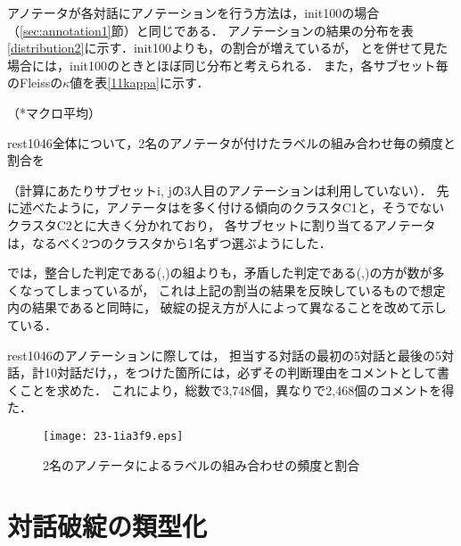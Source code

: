 \documentclass[japanese]{jnlp_1.4}
\newcommand{\maru}{}
\newcommand{\batsu}{}
\newcommand{\sankaku}{}
\renewcommand{\mod}[1]{}
\begin{document}
アノテータが各対話にアノテーションを行う方法は，init100の場合（\ref{sec:annotation1}節）と同じである．
アノテーションの結果の分布を表\ref{distribution2}に示す．init100よりも，\sankaku の割合が増えているが，
\sankaku と\batsu を併せて見た場合には，init100のときとほぼ同じ分布と考えられる．
また，各サブセット毎のFleissの$\kappa$値を表\ref{11kappa}に示す．
\mod{2名のアノテータが同じ判断傾向を持つかどうかによって，サブセット間で$\kappa$値にばらつきが生じているが，全体平均としてはinit100とほぼ同じ値になっている．}

\begin{table}[b]
\caption{rest1046中の\maru \sankaku \batsu  の発生割合（発生数）}
\label{distribution2}

\end{table}
\begin{table}[b]
\caption{サブセットa--k毎のFleissの$\kappa$値（i, jのみ3名でのアノテーション，その他は2名ずつ）}
\label{11kappa}

\vspace{4pt}\small
\hfill   （*マクロ平均）
\end{table}

rest1046全体について，2名のアノテータが付けたラベルの組み合わせ毎の頻度と割合を
\mod{図\ref{confusion}に示す}
（計算にあたりサブセットi, jの3人目のアノテーションは利用していない）．
先に述べたように，アノテータは\maru を多く付ける傾向のクラスタC1と，そうでないクラスタC2とに大きく分かれており，
各サブセットに割り当てるアノテータは，なるべく2つのクラスタから1名ずつ選ぶようにした．
\mod{図\ref{confusion}}
では，整合した判定である(\batsu,\batsu)の組よりも，矛盾した判定である(\maru,\batsu)の方が数が多くなってしまっているが，
これは上記の割当の結果を反映しているもので想定内の結果であると同時に，
破綻の捉え方が人によって異なることを改めて示している．

rest1046のアノテーションに際しては，
担当する対話の最初の5対話と最後の5対話，計10対話だけ，\sankaku，\batsu をつけた箇所には，必ずその判断理由をコメントとして書くことを求めた．
\pagebreak
これにより，総数で3,748個，異なりで2,468個のコメントを得た．
\mod{アノテーション作業は2014年12月2日から20日の間に行った．}

\begin{figure}[t]
\begin{center}
\texttt{[image: 23-1ia3f9.eps]}
\end{center}
\caption{2名のアノテータによるラベルの組み合わせの頻度と割合}
\label{confusion}
\end{figure}


\section{対話破綻の類型化}\label{sec:categorization}
\end{document}
